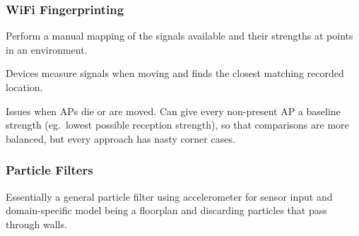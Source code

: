 \documentclass[a4paper, 11pt]{article}
\begin{document}
{{        \subsubsection*{WiFi Fingerprinting}
        {
            Perform a manual mapping of the signals available and their strengths at points in an environment.

            Devices measure signals when moving and finds the closest matching recorded location.

            Issues when APs die or are moved. Can give every non-present AP a baseline strength (eg.\ lowest possible reception strength), so that comparisons are more balanced, but every approach has nasty corner cases.
        }
        \subsubsection*{Particle Filters}
        {
            Essentially a general particle filter using accelerometer for sensor input and domain-specific model being a floorplan and discarding particles that pass through walls.
        }
    }
}
\end{document}
